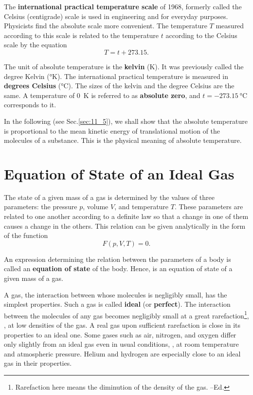 The \textbf{international practical temperature scale} of 1968, formerly called the Celsius (centigrade) scale is used in engineering and for everyday purposes. Physicists find the absolute scale more convenient. The temperature $T$ measured according to this scale is related to the temperature $t$ according to the Celsius scale by the equation
\begin{equation*}
	T = t + 273.15.
\end{equation*}

\noindent
The unit of absolute temperature is the \textbf{kelvin} (\si{\kelvin}). It was previously called the degree Kelvin (\si{\degree}K). The international practical temperature is measured in \textbf{degrees Celsius} (\si{\degreeCelsius}). The sizes of the kelvin and the degree Celsius are the same. A temperature of \SI{0}{\kelvin} is referred to as \textbf{absolute zero}, and $t=\SI{-273.15}{\degreeCelsius}$ corresponds to it.

In the following (see Sec.\ref{sec:11_5}), we shall show that the absolute temperature is proportional to the mean kinetic energy of translational motion of the molecules of a substance. This is the physical meaning of absolute temperature.

\section{Equation of State of an Ideal Gas}\label{sec:10_8}

The state of a given mass of a gas is determined by the values of three parameters: the pressure $p$, volume $V$, and temperature $T$. These parameters are related to one another according to a definite law so that a change in one of them causes a change in the others. This relation can be given analytically in the form of the function
\begin{equation}\label{eq:10_15}
	F(p,V,T) = 0.
\end{equation}

An expression determining the relation between the parameters of a body is called an \textbf{equation of state} of the body. Hence,  is an equation of state of a given mass of a gas.

A gas, the interaction between whose molecules is negligibly small, has the simplest properties. Such a gas is called \textbf{ideal} (or \textbf{perfect}). The interaction between the molecules of any gas becomes negligibly small at a great rarefaction\footnote{Rarefaction here means the diminution of the density of the gas. --Ed.}, \ie, at low densities of the gas. A real gas upon sufficient rarefaction is close in its properties to an ideal one. Some gases such as air, nitrogen, and oxygen differ only slightly from an ideal gas even in usual conditions, \ie, at room temperature and atmospheric pressure. Helium and hydrogen are especially close to an ideal gas in their properties.

